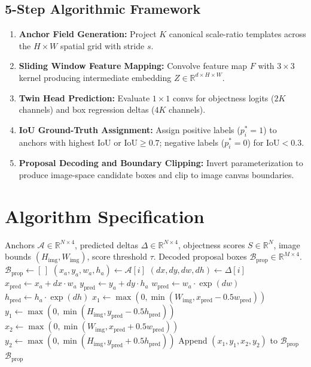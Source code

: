 \documentclass[11pt,a4paper]{article}
\theoremstyle{definition}
\begin{document}
\subsection{5-Step Algorithmic Framework}
\begin{enumerate}
    \item \textbf{Anchor Field Generation:} Project $K$ canonical scale-ratio templates across the $H \times W$ spatial grid with stride $s$.
    \item \textbf{Sliding Window Feature Mapping:} Convolve feature map $F$ with $3 \times 3$ kernel producing intermediate embedding $Z \in \mathbb{R}^{d \times H \times W}$.
    \item \textbf{Twin Head Prediction:} Evaluate $1 \times 1$ convs for objectness logits ($2K$ channels) and box regression deltas ($4K$ channels).
    \item \textbf{IoU Ground-Truth Assignment:} Assign positive labels ($p_i^* = 1$) to anchors with highest IoU or $\text{IoU} \ge 0.7$; negative labels ($p_i^* = 0$) for $\text{IoU} < 0.3$.
    \item \textbf{Proposal Decoding and Boundary Clipping:} Invert parameterization to produce image-space candidate boxes and clip to image canvas boundaries.
\end{enumerate}

\section{Algorithm Specification}

\begin{algorithm}[H]
\caption{RPN Proposal Decoding and Filtering}
\label{alg:rpn_decode}
\begin{algorithmic}[1]
\Require Anchors $\mathcal{A} \in \mathbb{R}^{N \times 4}$, predicted deltas $\Delta \in \mathbb{R}^{N \times 4}$, objectness scores $S \in \mathbb{R}^N$, image bounds $(H_{\text{img}}, W_{\text{img}})$, score threshold $\tau$.
\Ensure Decoded proposal boxes $\mathcal{B}_{\text{prop}} \in \mathbb{R}^{M \times 4}$.
\State $\mathcal{B}_{\text{prop}} \gets [\,]$
        \State $(x_a, y_a, w_a, h_a) \gets \mathcal{A}[i]$
        \State $(dx, dy, dw, dh) \gets \Delta[i]$
        \State $x_{\text{pred}} \gets x_a + dx \cdot w_a$
        \State $y_{\text{pred}} \gets y_a + dy \cdot h_a$
        \State $w_{\text{pred}} \gets w_a \cdot \exp(dw)$
        \State $h_{\text{pred}} \gets h_a \cdot \exp(dh)$
        \State $x_1 \gets \max(0, \min(W_{\text{img}}, x_{\text{pred}} - 0.5 w_{\text{pred}}))$
        \State $y_1 \gets \max(0, \min(H_{\text{img}}, y_{\text{pred}} - 0.5 h_{\text{pred}}))$
        \State $x_2 \gets \max(0, \min(W_{\text{img}}, x_{\text{pred}} + 0.5 w_{\text{pred}}))$
        \State $y_2 \gets \max(0, \min(H_{\text{img}}, y_{\text{pred}} + 0.5 h_{\text{pred}}))$
        \State Append $(x_1, y_1, x_2, y_2)$ to $\mathcal{B}_{\text{prop}}$
    \EndIf
\EndFor
\State \Return $\mathcal{B}_{\text{prop}}$
\end{algorithmic}
\end{algorithm}
\end{document}
